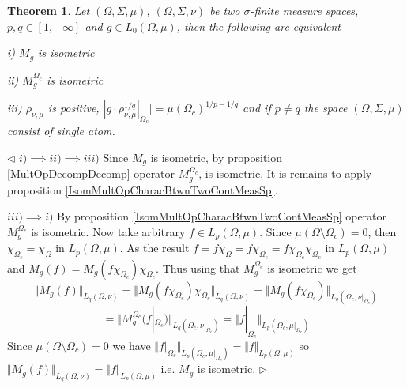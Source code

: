 \documentclass[12pt]{article}
\newtheorem{theorem}{Theorem}[subsection]
\newenvironment{proof}{\par $\triangleleft$}{$\triangleright$}
\begin{document}
\begin{theorem}\label{IsomMultOpCharacBtwnTwoMeasSp} Let $(\Omega,\Sigma,\mu)$, $(\Omega,\Sigma,\nu)$ be two $\sigma$-finite measure spaces, $p,q\in[1,+\infty]$ and $g\in L_0(\Omega,\mu)$, then the following are equivalent

i) $M_g$ is isometric

ii) $M_g^{\Omega_c}$ is isometric

iii) $\rho_{\nu,\mu}$ is positive, $|g\cdot \rho_{\nu,\mu}^{1/q}|_{\Omega_c}|=\mu(\Omega_c)^{1/p-1/q}$ and if  $p\neq q$ the space $(\Omega,\Sigma,\mu)$ consist of single atom.
\end{theorem}
\begin{proof}
$i)\implies ii)\implies iii)$ Since $M_g$ is isometric, by proposition \ref{MultOpDecompDecomp} operator $M_g^{\Omega_c}$, is isometric. It is remains to apply proposition \ref{IsomMultOpCharacBtwnTwoContMeasSp}.

$iii)\implies i)$ By proposition \ref{IsomMultOpCharacBtwnTwoContMeasSp} operator $M_g^{\Omega_c}$ is isometric. Now take arbitrary $f\in L_p(\Omega,\mu)$. Since $\mu(\Omega\setminus\Omega_c)=0$, then $\chi_{\Omega_c}=\chi_{\Omega}$ in $L_p(\Omega,\mu)$. As the result $f=f\chi_{\Omega}=f\chi_{\Omega_c}=f\chi_{\Omega_c}\chi_{\Omega_c}$ in $L_p(\Omega,\mu)$ and $M_g(f)=M_g(f\chi_{\Omega_c})\chi_{\Omega_c}$. Thus using that $M_g^{\Omega_c}$ is isometric we get
$$
\Vert M_g(f)\Vert_{L_q(\Omega,\nu)}
=\Vert M_g(f\chi_{\Omega_c})\chi_{\Omega_c}\Vert_{L_q(\Omega,\nu)}
=\Vert M_g(f\chi_{\Omega_c})\Vert_{L_q(\Omega_c,\nu|_{\Omega_c})}
$$
$$
=\Vert M_g^{\Omega_c}(f|_{\Omega_c})\Vert_{L_q(\Omega_c,\nu|_{\Omega_c})}
=\Vert f|_{\Omega_c}\Vert_{L_p(\Omega_c,\mu|_{\Omega_c})}
$$
Since $\mu(\Omega\setminus\Omega_c)=0$ we have $\Vert f|_{\Omega_c}\Vert_{L_p(\Omega_c,\mu|_{\Omega_c})}=\Vert f\Vert_{L_p(\Omega,\mu)}$ so $\Vert M_g(f)\Vert_{L_q(\Omega,\nu)}=\Vert f\Vert_{L_p(\Omega,\mu)}$ i.e.  $M_g$ is isometric.
\end{proof}
\end{document}
